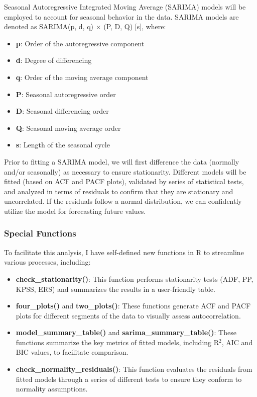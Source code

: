 \documentclass[11pt]{article}
\begin{document}
Seasonal Autoregressive Integrated Moving Average (SARIMA) models will be employed to account for seasonal behavior in the data. SARIMA models are denoted as SARIMA(p, d, q) $\times$ (P, D, Q) [s], where:

\begin{itemize}
\item \textbf{p}: Order of the autoregressive component
\item \textbf{d}: Degree of differencing
\item \textbf{q}: Order of the moving average component
\item \textbf{P}: Seasonal autoregressive order
\item \textbf{D}: Seasonal differencing order
\item \textbf{Q}: Seasonal moving average order
\item \textbf{s}: Length of the seasonal cycle
\end{itemize}

Prior to fitting a SARIMA model, we will first difference the data (normally and/or seasonally) as necessary to ensure stationarity. Different models will be fitted (based on ACF and PACF plots), validated by series of statistical tests, and analyzed in terms of residuals to confirm that they are stationary and uncorrelated. If the residuals follow a normal distribution, we can confidently utilize the model for forecasting future values.

\subsubsection{Special Functions}

To facilitate this analysis, I have self-defined new functions in R to streamline various processes, including:

\begin{itemize}
\item \textbf{check\_stationarity()}: This function performs stationarity tests (ADF, PP, KPSS, ERS) and summarizes the results in a user-friendly table.
\item \textbf{four\_plots()} and \textbf{two\_plots()}: These functions generate ACF and PACF plots for different segments of the data to visually assess autocorrelation.
\item \textbf{model\_summary\_table()} and \textbf{sarima\_summary\_table()}: These functions summarize the key metrics of fitted models, including R$^2$, AIC and BIC values, to facilitate comparison.
\item \textbf{check\_normality\_residuals()}: This function evaluates the residuals from fitted models through a series of different tests to ensure they conform to normality assumptions.
\end{itemize}
\end{document}
